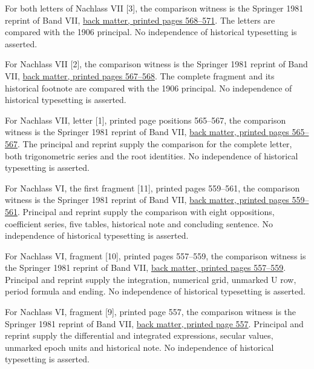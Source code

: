 For both letters of Nachlass VII [3], the comparison witness is the Springer 1981 reprint of Band VII, \href{https://link.springer.com/content/pdf/bbm:978-3-642-92478-1/1}{back matter, printed pages 568--571}. The letters are compared with the 1906 principal. No independence of historical typesetting is asserted.



For Nachlass VII [2], the comparison witness is the Springer 1981 reprint of Band VII, \href{https://link.springer.com/content/pdf/bbm:978-3-642-92478-1/1}{back matter, printed pages 567--568}. The complete fragment and its historical footnote are compared with the 1906 principal. No independence of historical typesetting is asserted.



For Nachlass VII, letter [1], printed page positions 565--567, the comparison witness is the Springer 1981 reprint of Band VII, \href{https://link.springer.com/content/pdf/bbm:978-3-642-92478-1/1}{back matter, printed pages 565--567}. The principal and reprint supply the comparison for the complete letter, both trigonometric series and the root identities. No independence of historical typesetting is asserted.



For Nachlass VI, the first fragment [11], printed pages 559--561, the comparison witness is the Springer 1981 reprint of Band VII, \href{https://link.springer.com/content/pdf/bbm:978-3-642-92478-1/1}{back matter, printed pages 559--561}. Principal and reprint supply the comparison with eight oppositions, coefficient series, five tables, historical note and concluding sentence. No independence of historical typesetting is asserted.



For Nachlass VI, fragment [10], printed pages 557--559, the comparison witness is the Springer 1981 reprint of Band VII, \href{https://link.springer.com/content/pdf/bbm:978-3-642-92478-1/1}{back matter, printed pages 557--559}. Principal and reprint supply the integration, numerical grid, unmarked U row, period formula and ending. No independence of historical typesetting is asserted.



For Nachlass VI, fragment [9], printed page 557, the comparison witness is the Springer 1981 reprint of Band VII, \href{https://link.springer.com/content/pdf/bbm:978-3-642-92478-1/1}{back matter, printed page 557}. Principal and reprint supply the differential and integrated expressions, secular values, unmarked epoch units and historical note. No independence of historical typesetting is asserted.



